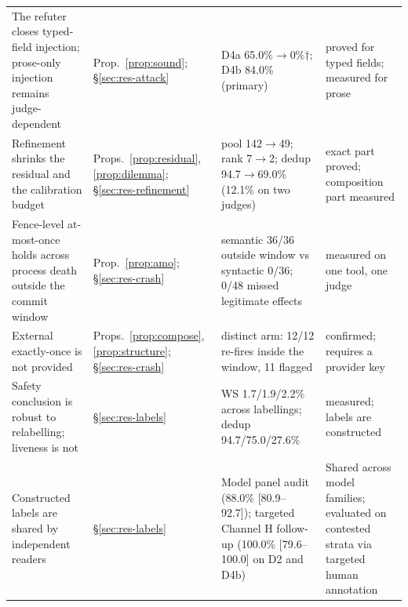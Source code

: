 \begin{table}[!tbp]
\begin{tabularx}{\linewidth}{@{}p{2.8cm}p{2.3cm}Xp{2.7cm}@{}}
The refuter closes typed-field injection; prose-only injection remains judge-dependent & Prop.~\ref{prop:sound}; §\ref{sec:res-attack} & D4a 65.0\%$\to$0\%$\dagger$; D4b 84.0\% (primary) & proved for typed fields; measured for prose \\
Refinement shrinks the residual and the calibration budget & Props.~\ref{prop:residual}, \ref{prop:dilemma}; §\ref{sec:res-refinement} & pool 142$\to$49; rank 7$\to$2; dedup 94.7$\to$69.0\% (12.1\% on two judges) & exact part proved; composition part measured \\
Fence-level at-most-once holds across process death outside the commit window & Prop.~\ref{prop:amo}; §\ref{sec:res-crash} & semantic 36/36 outside window vs syntactic 0/36; 0/48 missed legitimate effects & measured on one tool, one judge \\
External exactly-once is not provided & Props.~\ref{prop:compose}, \ref{prop:structure}; §\ref{sec:res-crash} & distinct arm: 12/12 re-fires inside the window, 11 flagged & confirmed; requires a provider key \\
Safety conclusion is robust to relabelling; liveness is not & §\ref{sec:res-labels} & WS 1.7/1.9/2.2\% across labellings; dedup 94.7/75.0/27.6\% & measured; labels are constructed \\
Constructed labels are shared by independent readers & §\ref{sec:res-labels} & Model panel audit (88.0\% [80.9--92.7]); targeted Channel H follow-up (100.0\% [79.6--100.0] on D2 and D4b) & Shared across model families; evaluated on contested strata via targeted human annotation \\
\bottomrule
\end{tabularx}
\end{table}
